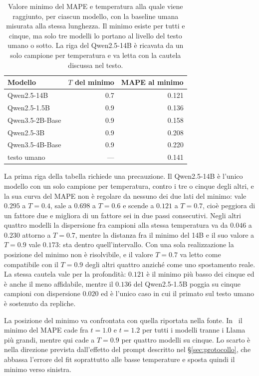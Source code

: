 \begin{table}[htbp]
\centering
\small
\begin{tabular}{@{}lrr@{}}
\toprule
Modello & $T$ del minimo & MAPE al minimo \\
\midrule
Qwen2.5-14B      & 0.7 & 0.121 \\
Qwen2.5-1.5B     & 0.9 & 0.136 \\
Qwen3.5-2B-Base  & 0.9 & 0.158 \\
Qwen2.5-3B       & 0.9 & 0.208 \\
Qwen3.5-4B-Base  & 0.9 & 0.220 \\
\midrule
testo umano      & --- & 0.141 \\
\bottomrule
\end{tabular}
\caption{Valore minimo del MAPE e temperatura alla quale viene raggiunto, per
ciascun modello, con la baseline umana misurata alla stessa lunghezza. Il
minimo esiste per tutti e cinque, ma solo tre modelli lo portano al livello del
testo umano o sotto. La riga del Qwen2.5-14B è ricavata da un solo campione per
temperatura e va letta con la cautela discussa nel testo.}
\label{tab:mape-minimi}
\end{table}

La prima riga della tabella richiede una precauzione. Il Qwen2.5-14B è l'unico
modello con un solo campione per temperatura, contro i tre o cinque degli altri,
e la sua curva del MAPE non è regolare da nessuno dei due lati del minimo: vale
$0.295$ a $T = 0.4$, sale a $0.698$ a $T = 0.6$ e scende a $0.121$ a $T = 0.7$,
cioè peggiora di un fattore due e migliora di un fattore sei in due passi
consecutivi. Negli altri quattro modelli la dispersione fra campioni alla stessa
temperatura va da $0.046$ a $0.230$ attorno a $T = 0.7$, mentre la distanza fra
il minimo del 14B e il suo valore a $T = 0.9$ vale $0.173$: sta dentro
quell'intervallo. Con una sola realizzazione la posizione del minimo non è
risolvibile, e il valore $T = 0.7$ va letto come compatibile con il $T = 0.9$
degli altri quattro anziché come uno spostamento reale. La stessa cautela vale
per la profondità: $0.121$ è il minimo più basso dei cinque ed è anche il meno
affidabile, mentre il $0.136$ del Qwen2.5-1.5B poggia su cinque campioni con
dispersione $0.020$ ed è l'unico caso in cui il primato sul testo umano è
sostenuto da repliche.

La posizione del minimo va confrontata con quella riportata nella fonte.
In~\cite{mikhaylovskiy2025zipf} il minimo del MAPE cade fra $t = 1.0$ e
$t = 1.2$ per tutti i modelli tranne i Llama più grandi, mentre qui cade a
$T = 0.9$ per quattro modelli su cinque. Lo scarto è nella direzione prevista
dall'effetto del prompt descritto nel §\ref{sec:protocollo}, che abbassa
l'errore del fit soprattutto alle basse temperature e sposta quindi il minimo
verso sinistra.

